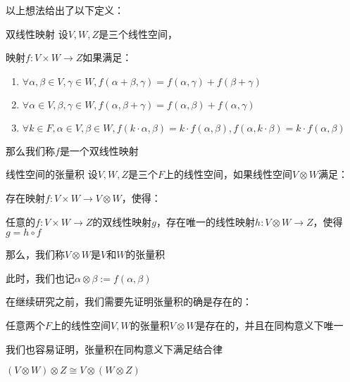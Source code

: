 \documentclass[12pt, a4paper, oneside, UTF8]{ctexbook}
\begin{document}
			以上想法给出了以下定义：
			\begin{defn}{双线性映射}{}
				设$V,W,Z$是三个线性空间，

				映射$f:V \times W \to Z$如果满足：

				\begin{enumerate}
					\item $\forall \alpha ,\beta \in V,\gamma \in W,f(\alpha +\beta ,\gamma )=f(\alpha ,\gamma )+f(\beta +\gamma )$
					\item $\forall \alpha \in V,\beta ,\gamma \in W,f(\alpha ,\beta +\gamma )=f(\alpha ,\beta )+f(\alpha ,\gamma )$
					\item $\forall k \in F,\alpha \in V,\beta \in W,f(k\cdot\alpha ,\beta )=k\cdot f(\alpha ,\beta ),f(\alpha ,k\cdot \beta )=k\cdot f(\alpha ,\beta )$ 
				\end{enumerate}
				那么我们称$f$是一个双线性映射
			\end{defn}
			\begin{defn}{线性空间的张量积}{}
				设$V,W,Z$是三个$F$上的线性空间，如果线性空间$V \otimes W$满足：

				存在映射$f:V \times W \to V \otimes W$，使得：

				任意的$f:V \times W \to Z$的双线性映射$g$，存在唯一的线性映射$h:V \otimes W \to Z$，使得$g = h \circ f$

				那么，我们称$V \otimes W$是$V$和$W$的张量积

				此时，我们也记$\alpha \otimes \beta := f(\alpha ,\beta )$
			\end{defn}
			在继续研究之前，我们需要先证明张量积的确是存在的：
			\begin{proposition}
				任意两个$F$上的线性空间$V,W$的张量积$V \otimes W$是存在的，并且在同构意义下唯一
			\end{proposition}
			我们也容易证明，张量积在同构意义下满足结合律
			\begin{proposition}
				$(V \otimes W) \otimes Z \cong V \otimes (W \otimes Z)$
			\end{proposition}
\end{document}
